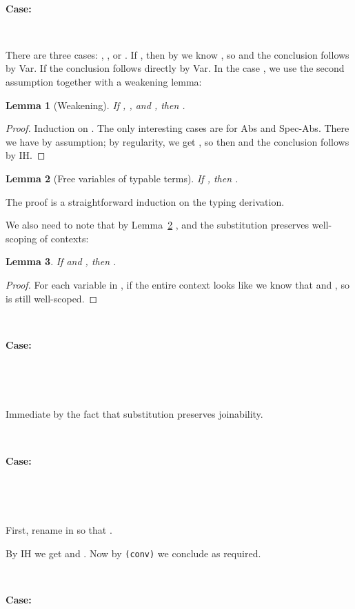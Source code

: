 \documentclass[copyright]{eptcs}
\newtheorem{lemma}{Lemma}
\begin{document}
\ 

\noindent \textbf{Case:}

\



There are three cases: , , or . If , then by  we know , so  and the conclusion follows by Var. If  the conclusion follows directly by Var. In the case , we use the second assumption together with a weakening lemma:

\begin{lemma}[Weakening]
\label{lem:weak}
If , , and , then .
\end{lemma}
\begin{proof}
Induction on . The only interesting cases are for Abs and Spec-Abs. There we have  by assumption; by regularity, we get , so then  and the conclusion follows by IH.
\end{proof}

\begin{lemma}[Free variables of typable terms]
\label{lem:vars}
If , then .
\end{lemma}
\noindent The proof is a straightforward induction on the typing
derivation.

We also need to note that by Lemma~\ref{lem:vars} , and the substitution preserves well-scoping of contexts:

\begin{lemma}
If  and , then .
\end{lemma}
\begin{proof}
For each variable  in , if the entire context looks like   we know that  and , so  is still well-scoped.
\end{proof}

\ 

\noindent \textbf{Case:}

\



\ 

\noindent Immediate by the fact that substitution preserves joinability.

\ 

\noindent \textbf{Case:}

\



\ 

\noindent First, rename  in  so that .

By IH we get  and . Now by \texttt{(conv)} we conclude  as required.

\ 

\noindent \textbf{Case:}
\end{document}
